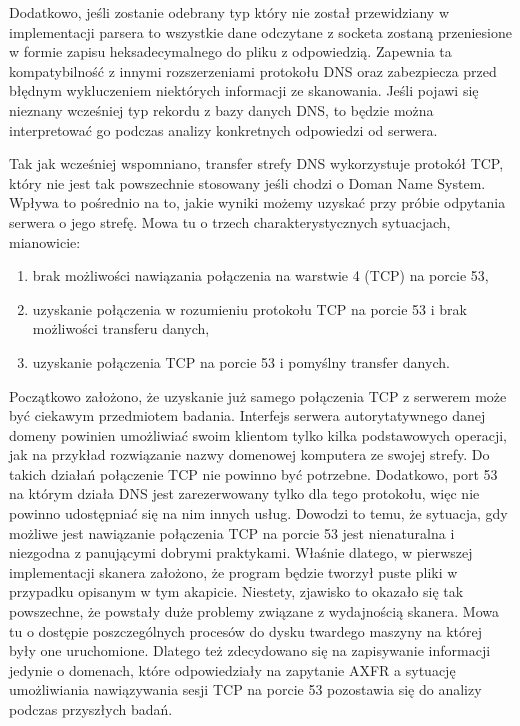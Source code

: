 Dodatkowo, jeśli zostanie odebrany typ który nie został przewidziany w implementacji parsera to wszystkie dane odczytane z
socketa zostaną przeniesione w formie zapisu heksadecymalnego do pliku z odpowiedzią. Zapewnia ta kompatybilność z innymi
rozszerzeniami protokołu DNS oraz zabezpiecza przed błędnym wykluczeniem niektórych informacji ze skanowania. Jeśli pojawi
się nieznany wcześniej typ rekordu z bazy danych DNS, to będzie można interpretować go podczas analizy konkretnych odpowiedzi
od serwera.

Tak jak wcześniej wspomniano, transfer strefy DNS wykorzystuje protokół TCP, który nie jest tak powszechnie stosowany jeśli chodzi
o Doman Name System. Wpływa to pośrednio na to, jakie wyniki możemy uzyskać przy próbie odpytania serwera o jego strefę. Mowa tu o
trzech charakterystycznych sytuacjach, mianowicie:
\begin{enumerate}
	\item brak możliwości nawiązania połączenia na warstwie 4 (TCP) na porcie 53,
	\item uzyskanie połączenia w rozumieniu protokołu TCP na porcie 53 i brak możliwości transferu danych,
	\item uzyskanie połączenia TCP na porcie 53 i pomyślny transfer danych.
\end{enumerate}

Początkowo założono, że uzyskanie już samego połączenia TCP z serwerem może być ciekawym przedmiotem badania. Interfejs serwera
autorytatywnego danej domeny powinien umożliwiać swoim klientom tylko kilka podstawowych operacji, jak na przykład rozwiązanie nazwy
domenowej komputera ze swojej strefy. Do takich działań połączenie TCP nie powinno być potrzebne. Dodatkowo, port 53 na którym działa
DNS jest zarezerwowany tylko dla tego protokołu, więc nie powinno udostępniać się na nim innych usług. Dowodzi to temu, że sytuacja,
gdy możliwe jest nawiązanie połączenia TCP na porcie 53 jest nienaturalna i niezgodna z panującymi dobrymi praktykami. Właśnie dlatego,
w pierwszej implementacji skanera założono, że program będzie tworzył puste pliki w przypadku opisanym w tym akapicie. Niestety,
zjawisko to okazało się tak powszechne, że powstały duże problemy związane z wydajnością skanera. Mowa tu o dostępie poszczególnych
procesów do dysku twardego maszyny na której były one uruchomione. Dlatego też zdecydowano się na zapisywanie informacji jedynie o
domenach, które odpowiedziały na zapytanie AXFR a sytuację umożliwiania nawiązywania sesji TCP na porcie 53 pozostawia się do analizy
podczas przyszłych badań.

